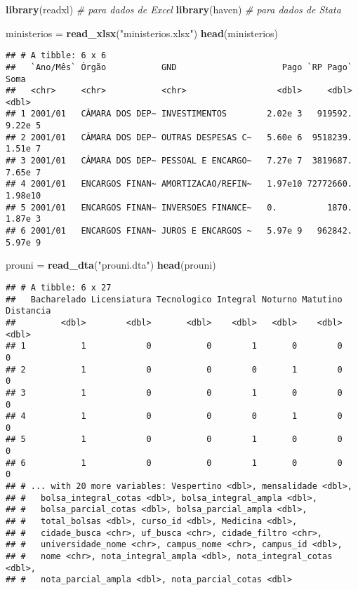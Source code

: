 \documentclass[]{article}
\newenvironment{Shaded}{\begin{snugshade}}{\end{snugshade}}
\newcommand{\KeywordTok}[1]{\textcolor[rgb]{0.13,0.29,0.53}{\textbf{#1}}}
\newcommand{\StringTok}[1]{\textcolor[rgb]{0.31,0.60,0.02}{#1}}
\newcommand{\CommentTok}[1]{\textcolor[rgb]{0.56,0.35,0.01}{\textit{#1}}}
\newcommand{\NormalTok}[1]{#1}
\begin{document}
\begin{Shaded}
\begin{Highlighting}[]
\KeywordTok{library}\NormalTok{(readxl) }\CommentTok{# para dados de Excel}
\KeywordTok{library}\NormalTok{(haven) }\CommentTok{# para dados de Stata}

\NormalTok{ministerios =}\StringTok{ }\KeywordTok{read_xlsx}\NormalTok{(}\StringTok{"ministerios.xlsx"}\NormalTok{)}
\KeywordTok{head}\NormalTok{(ministerios)}
\end{Highlighting}
\end{Shaded}

\begin{verbatim}
## # A tibble: 6 x 6
##   `Ano/Mês` Órgão           GND                     Pago `RP Pago`     Soma
##   <chr>     <chr>           <chr>                  <dbl>     <dbl>    <dbl>
## 1 2001/01   CÂMARA DOS DEP~ INVESTIMENTOS        2.02e 3   919592.  9.22e 5
## 2 2001/01   CÂMARA DOS DEP~ OUTRAS DESPESAS C~   5.60e 6  9518239.  1.51e 7
## 3 2001/01   CÂMARA DOS DEP~ PESSOAL E ENCARGO~   7.27e 7  3819687.  7.65e 7
## 4 2001/01   ENCARGOS FINAN~ AMORTIZACAO/REFIN~   1.97e10 72772660.  1.98e10
## 5 2001/01   ENCARGOS FINAN~ INVERSOES FINANCE~   0.          1870.  1.87e 3
## 6 2001/01   ENCARGOS FINAN~ JUROS E ENCARGOS ~   5.97e 9   962842.  5.97e 9
\end{verbatim}

\begin{Shaded}
\begin{Highlighting}[]
\NormalTok{prouni =}\StringTok{ }\KeywordTok{read_dta}\NormalTok{(}\StringTok{"prouni.dta"}\NormalTok{)}
\KeywordTok{head}\NormalTok{(prouni)}
\end{Highlighting}
\end{Shaded}

\begin{verbatim}
## # A tibble: 6 x 27
##   Bacharelado Licensiatura Tecnologico Integral Noturno Matutino Distancia
##         <dbl>        <dbl>       <dbl>    <dbl>   <dbl>    <dbl>     <dbl>
## 1           1            0           0        1       0        0         0
## 2           1            0           0        0       1        0         0
## 3           1            0           0        1       0        0         0
## 4           1            0           0        0       1        0         0
## 5           1            0           0        1       0        0         0
## 6           1            0           0        1       0        0         0
## # ... with 20 more variables: Vespertino <dbl>, mensalidade <dbl>,
## #   bolsa_integral_cotas <dbl>, bolsa_integral_ampla <dbl>,
## #   bolsa_parcial_cotas <dbl>, bolsa_parcial_ampla <dbl>,
## #   total_bolsas <dbl>, curso_id <dbl>, Medicina <dbl>,
## #   cidade_busca <chr>, uf_busca <chr>, cidade_filtro <chr>,
## #   universidade_nome <chr>, campus_nome <chr>, campus_id <dbl>,
## #   nome <chr>, nota_integral_ampla <dbl>, nota_integral_cotas <dbl>,
## #   nota_parcial_ampla <dbl>, nota_parcial_cotas <dbl>
\end{verbatim}
\end{document}

